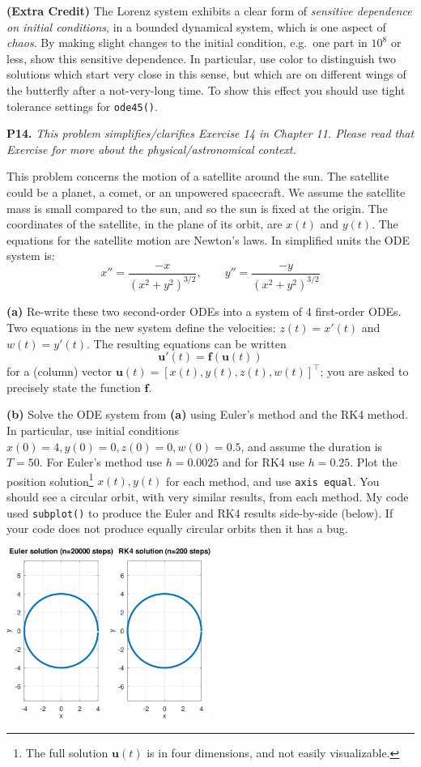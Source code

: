 \documentclass[12pt]{amsart}
\newcommand{\bbf}{\mathbf{f}}
\newcommand{\bu}{\mathbf{u}}
\newcommand{\prob}[1]{\bigskip\noindent\textbf{#1.}\quad }
\newcommand{\epart}[1]{\medskip\noindent\textbf{(#1)}\quad }
\begin{document}
\epart{Extra Credit}  The Lorenz system exhibits a clear form of \emph{sensitive dependence on initial conditions}, in a bounded dynamical system, which is one aspect of \emph{chaos}.  By making slight changes to the initial condition, e.g.~one part in $10^8$ or less, show this sensitive dependence.  In particular, use color to distinguish two solutions which start very close in this sense, but which are on different wings of the butterfly after a not-very-long time.  To show this effect you should use tight tolerance settings for \texttt{ode45()}.

\prob{P14} \emph{This problem simplifies/clarifies Exercise 14 in Chapter 11.  Please read that Exercise for more about the physical/astronomical context.}

\medskip \noindent This problem concerns the motion of a satellite around the sun.  The satellite could be a planet, a comet, or an unpowered spacecraft.  We assume the satellite mass is small compared to the sun, and so the sun is fixed at the origin.  The coordinates of the satellite, in the plane of its orbit, are $x(t)$ and $y(t)$.  The equations for the satellite motion are Newton's laws.  In simplified units the ODE system is:
	$$x'' = \frac{-x}{(x^2+y^2)^{3/2}}, \qquad y'' = \frac{-y}{(x^2+y^2)^{3/2}}$$

\epart{a}  Re-write these two second-order ODEs into a system of 4 first-order ODEs.  Two equations in the new system define the velocities: $z(t)=x'(t)$ and $w(t)=y'(t)$.  The resulting equations can be written
    $$\bu'(t) = \bbf(\bu(t))$$
for a (column) vector $\bu(t) = [x(t), y(t), z(t), w(t)]^\top$; you are asked to precisely state the function $\bbf$.

\epart{b}  Solve the ODE system from \textbf{(a)} using Euler's method and the RK4 method.  In particular, use initial conditions $x(0)=4,y(0)=0,z(0)=0,w(0)=0.5$, and assume the duration is $T=50$.  For Euler's method use $h=0.0025$ and for RK4 use $h=0.25$.  Plot the position solution\footnote{The full solution $\bu(t)$ is in four dimensions, and not easily visualizable.} $x(t),y(t)$ for each method, and use \texttt{axis equal}.  You should see a circular orbit, with very similar results, from each method.  My code used \texttt{subplot()} to produce the Euler and RK4 results side-by-side (below).  If your code does not produce equally circular orbits then it has a bug.

\medskip
\begin{center}
\includegraphics[width=0.5\textwidth]{figs/circleorbit.pdf}
\end{center}
\end{document}
